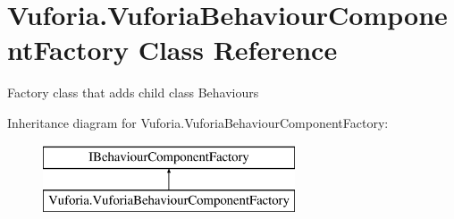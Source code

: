 \hypertarget{class_vuforia_1_1_vuforia_behaviour_component_factory}{}\section{Vuforia.\+Vuforia\+Behaviour\+Component\+Factory Class Reference}
\label{class_vuforia_1_1_vuforia_behaviour_component_factory}


Factory class that adds child class Behaviours  


Inheritance diagram for Vuforia.\+Vuforia\+Behaviour\+Component\+Factory\+:\begin{figure}[H]
\begin{center}
\leavevmode
\includegraphics[height=2.000000cm]{class_vuforia_1_1_vuforia_behaviour_component_factory}
\end{center}
\end{figure}
